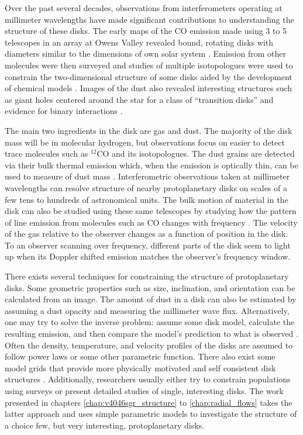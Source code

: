 Over the past several decades, observations from interferometers operating at millimeter wavelengths have made
significant contributions to understanding the structure of these disks.  The early maps of the CO emission
made using 3 to 5 telescopes in an array at Owens Valley revealed bound, rotating disks with diameters 
similar to the dimensions of own solar system \citep{sargent87,weintraub89,koerner93}.  Emission from other 
molecules were then surveyed \citep{dutrey97} and studies of multiple isotopologues were used to constrain the 
two-dimensional structure of some disks \citep{dartois03,pietu07,qi11} aided by the development of 
chemical models \citep{aikawa99,aikawa01}.  Images of the dust also revealed interesting structures such as
giant holes centered around the star for a class of ``transition disks'' \citep{hughes07,brown09,andrews11} and 
evidence for binary interactions \citep{akeson98}.


The main two ingredients in the disk are gas and dust.  The majority of the disk mass will be in molecular 
hydrogen, but observations focus on easier to detect trace molecules such as $^{12}$CO and its isotopologues.
The dust grains are detected via their bulk thermal emission which, when the emission is optically thin,  
can be used to measure of dust mass \citep{hildebrand83}.  Interferometric observations taken at 
millimeter wavelengths can resolve structure of nearby protoplanetary disks on scales of a few tens to 
hundreds of astronomical units.  The bulk motion of material in the disk can also be 
studied using these same telescopes by studying how the pattern of line emission
from molecules such as CO changes with frequency \citep{beckwith93}.  The velocity of the gas relative to the 
observer changes as a function of position in the disk. To an observer scanning over frequency, different parts 
of the disk seem to light up when its Doppler shifted emission matches the observer's frequency window.

There exists several techniques for constraining the structure of protoplanetary disks.  Some geometric 
properties such as size, inclination, and orientation can be calculated from an image.  The amount of dust 
in a disk can also be estimated by assuming a dust opacity and measuring the millimeter wave flux.  
Alternatively, one may try to solve the inverse problem: assume some disk model, calculate the resulting 
emission, and then compare the model's prediction to what is observed \citep[i.e.][]{dartois03,qi03}.  Often the 
density, temperature, and velocity profiles of the disks are assumed to 
follow power laws or some other parametric function.  There also exist some model grids that provide more
physically motivated and self consistent disk structures \citep{dalessio05,woitke10}.  Additionally, researchers 
usually either try to constrain populations using 
surveys \citep[i.e.][]{andrews11,oberg11,harris12} or present detailed studies of single, 
interesting disks.  The work
presented in chapters \ref{chap:v4046sgr_structure} to \ref{chap:radial_flows} takes the latter approach and 
uses simple parametric 
models to investigate the structure of a choice few, but very interesting, protoplanetary disks.

